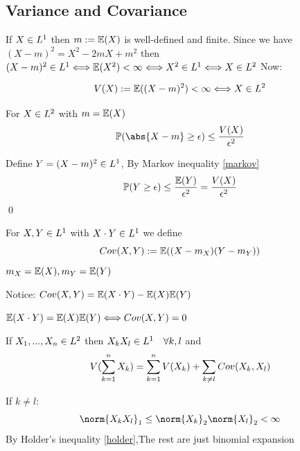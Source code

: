 \subsection*{Variance and Covariance}
If $X\in L^{1}$ then $m := \mathbb{E}(X)$ is well-defined and finite. Since we have $(X-m)^2 = X^2 - 2mX + m^2$ then $(X-m)^2\in L^{1}\Longleftrightarrow \mathbb{E}(X^2) < \infty \Longleftrightarrow X^2\in L^{1} \Longleftrightarrow X\in L^{2}$ Now:
\begin{dfn}[Variance of $X$]
\begin{equation*}
    V(X) := \mathbb{E}((X-m)^2) < \infty \Longleftrightarrow X\in L^{2}
\end{equation*}
\end{dfn}
\begin{thm}
\label{Chebyshev}
For $X\in L^{2}$ with $m = \mathbb{E}(X)$
\begin{equation*}
    \prob(\abs{X-m}\geq \epsilon) \leq \frac{V(X)}{\epsilon^2}
\end{equation*}
\end{thm}
\pf Define $Y = (X-m)^2 \in L^{1}$, By Markov inequality \ref{markov}
\begin{equation*}
\mathbb{P}(Y\geq \epsilon) \leq \frac{\mathbb{E}(Y)}{\epsilon^2} =  \frac{V(X)}{\epsilon^2}   
\end{equation*}\qed
\begin{dfn}
For $X,Y\in L^{1}$ with $X\cdot Y\in L^{1}$ we define 
\begin{equation*}
    Cov(X,Y) := \mathbb{E}((X-m_X)(Y-m_Y))
\end{equation*}$m_X = \mathbb{E}(X) , m_Y = \mathbb{E}(Y)$
\end{dfn}Notice: $Cov(X,Y) = \mathbb{E}(X\cdot Y) - \mathbb{E}(X)\mathbb{E}(Y)$
\begin{dfn}
$\mathbb{E}(X\cdot Y) = \mathbb{E}(X)\mathbb{E}(Y) \Longleftrightarrow Cov(X,Y) = 0$
\end{dfn}
\begin{lem}
If $X_1,...,X_n \in L^{2}$ then $X_k X_l \in L^{1} \quad\forall k,l$ and \begin{equation*}
    V(\sum\limits_{k=1}^n X_k) = \sum\limits_{k=1}^n V(X_k) + \sum\limits_{k\neq l}Cov(X_k,X_l)
\end{equation*}
\end{lem}
\pf If $k \neq l:$
\begin{equation*}
    \norm{X_k X_l}_1 \leq \norm{X_k}_2\norm{X_l}_2 < \infty
\end{equation*}By Holder's inequality \ref{holder},The rest are just binomial expansion \\

